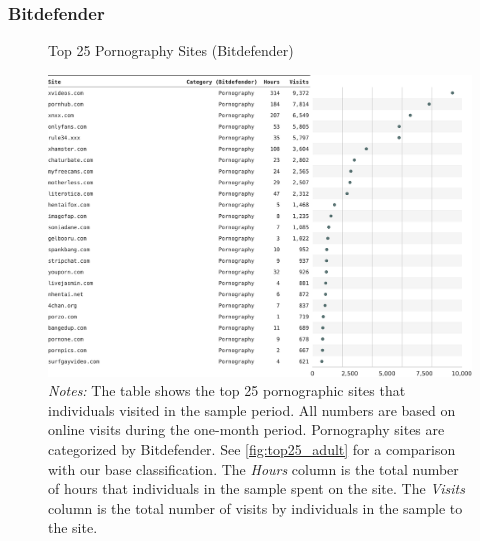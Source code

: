 \documentclass[12pt,twoside]{article}
\begin{document}
\subsubsection{Bitdefender}
\begin{figure}[ht]
	\centering
	\caption{Top 25 Pornography Sites (Bitdefender)}
	\includegraphics[width=\textwidth]{figs/top_25_adultsites_bitdefender.pdf}
	\caption*{\footnotesize \emph{Notes:} 
		The table shows the top 25 pornographic sites that individuals visited in the sample period.
            All numbers are based on online visits during the one-month period.
		Pornography sites are categorized by Bitdefender.
            See \cref{fig:top25_adult} for a comparison with our base classification.
    	The \emph{Hours} column is the total number of hours that individuals in the sample spent on the site. 
    	The \emph{Visits} column is the total number of visits by individuals in the sample to the site.            
	}
	\label{fig:top25_adult_bitdefender}
\end{figure}





\end{document}
